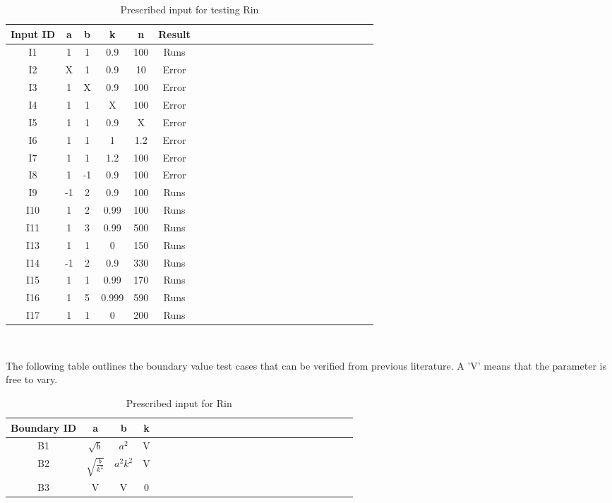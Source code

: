 \documentclass[12pt, titlepage]{article}
\begin{document}
\begin{table}[h!]
	\centering
	\begin{tabular}{|c|c|c|c|c|c|c|c|c|c|c|c|c|c|c|c|c|c|c|c|c|c|c|c|}
		\hline        
		Input ID& a& b & k & n& Result \\
		\hline
		I1     &1 &1 &0.9 &100 & Runs \\ \hline
		I2    &X &1 &0.9 &10 & Error \\ \hline
		I3    &1 &X &0.9 &100 & Error\\ \hline 
		I4    &1 &1 &X &100 &Error \\ \hline 
		I5     &1 &1 &0.9 &X &Error \\ \hline
		I6    &1 &1 &1 & 1.2& Error\\ \hline
		I7    &1 &1 &1.2 & 100&Error\\ \hline 
		I8    &1 &-1 &0.9 &100& Error \\ \hline
		I9     &-1 &2 &0.9 &100 & Runs \\ \hline
		I10    &1 &2 &0.99 &100 & Runs\\ \hline
		I11    &1 &3 &0.99 &500 & Runs \\ \hline 
		I13   &1 &1 &0 &150 &Runs  \\ \hline
		I14     &-1 &2 &0.9 &330 & Runs \\ \hline
		I15    &1 &1 &0.99 &170 & Runs\\ \hline
		I16    &1 &5 &0.999 &590 & Runs \\ \hline 
		I17   &1 &1 &0 &200 &Runs  \\ 
		\hline
	\end{tabular}\\
	\caption{Prescribed input for testing Rin}
	\label{Table:D_1}
\end{table} 

The following table outlines the boundary value test cases that can be verified 
from previous literature. A 'V' means that the parameter is free to vary.
\begin{table}[h!]
	\centering
	\begin{tabular}{|c|c|c|c|c|c|c|c|c|c|c|c|c|c|c|c|c|c|c|c|c|c|c|c|}
		\hline        
		Boundary ID& a& b& k  \\
		\hline
		B1     &$\sqrt{b}$ &$a^{2}$ &V    \\ \hline
		B2    &$\sqrt{\frac{b}{k^{2}}}$ &$a^{2}k^{2}$ &V   \\ \hline
		B3    &V &V &0  \\ 
		\hline
	\end{tabular}\\
	\caption{Prescribed input for Rin}
	\label{Table:D_2}
\end{table} 
\end{document}
